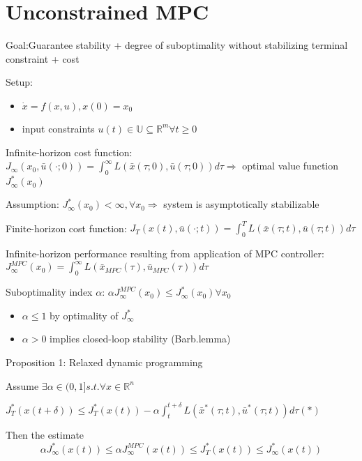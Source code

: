 \section{Unconstrained MPC}\label{chap3}

Goal:Guarantee stability + degree of suboptimality
without stabilizing terminal constraint + cost

Setup: 
\begin{itemize}
\item $\dot x = f(x,u), x(0)=x_0$
\item input constraints $u(t) \in \mathbb{U} \subseteq \mathbb{R}^m \forall t \geq 0$
\end{itemize}

Infinite-horizon cost function:
$J_{\infty}(x_0, \bar{u}(\cdot; 0)) = \int_{0}^{\infty}L(\bar x(\tau;0), \bar u(\tau;0))d\tau  \Rightarrow$ optimal value function $J_{\infty}^*(x_0)$

Assumption: $J^{*}_{\infty}(x_0) < \infty, \forall x_0 \Rightarrow$ system is asymptotically stabilizable

Finite-horizon cost function:
$J_{T}(x(t), \bar{u}(\cdot; t)) = \int_{0}^{T}L(\bar x(\tau;t), \bar u(\tau;t))d\tau$

Infinite-horizon performance resulting from application of MPC controller:
$J_{\infty}^{MPC}(x_0) = \int_{0}^{\infty}L(\bar x_{MPC}(\tau), \bar u_{MPC}(\tau))d\tau$

\begin{Definition}
Suboptimality index $\alpha$:
$\alpha J_{\infty}^{MPC}(x_0) \leq J_{\infty}^{*}(x_0) \forall x_0$

\begin{itemize}
\item $\alpha \leq 1$ by optimality of $J^{*}_{\infty}$
\item $\alpha > 0$ implies closed-loop stability (Barb.lemma)
\end{itemize}
\end{Definition}

Proposition 1: Relaxed dynamic programming
 
Assume $\exists \alpha \in (0,1] s.t. \forall x \in \mathbb{R}^n$

$J_{T}^{*}(x(t+\delta)) \leq J_T^*(x(t)) - \alpha\int_{t}^{t+\delta}L(\bar x^*(\tau;t),\bar u^*(\tau;t))d\tau (*)$

Then the estimate 
\begin{equation}\label{main_inequility}
\alpha J_{\infty}^*(x(t)) \leq \alpha J_{\infty}^{MPC}(x(t)) \leq J_T^*(x(t)) \leq J_{\infty}^*(x(t))
\end{equation}

